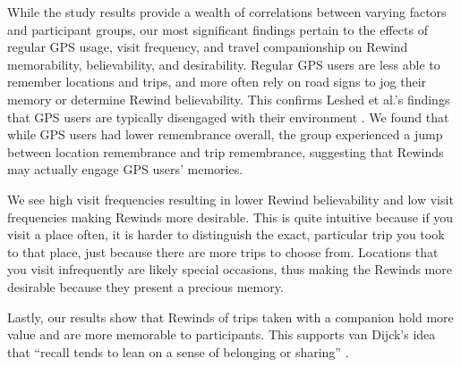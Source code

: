 \documentclass{sigchi}
\begin{document}
While the study results provide a wealth of correlations between varying factors and participant groups, our most significant findings pertain to the effects of regular GPS usage, visit frequency, and travel companionship on Rewind memorability, believability, and desirability. Regular GPS users are less able to remember locations and trips, and more often rely on road signs to jog their memory or determine Rewind believability. This confirms Leshed et al.'s findings that GPS users are typically disengaged with their environment \cite{leshed2008car}. We found that while GPS users had lower remembrance overall, the group experienced a jump between location remembrance and trip remembrance, suggesting that Rewinds may actually engage GPS users' memories. 

We see high visit frequencies resulting in lower Rewind believability and low visit frequencies making Rewinds more desirable. This is quite intuitive because if you visit a place often, it is harder to distinguish the exact, particular trip you took to that place, just because there are more trips to choose from. Locations that you visit infrequently are likely special occasions, thus making the Rewinds more desirable because they present a precious memory.

Lastly, our results show that Rewinds of trips taken with a companion hold more value and are more memorable to participants. This supports van Dijck's idea that ``recall tends to lean on a sense of belonging or sharing'' \cite{van2007mediated}.

		
\end{document}
